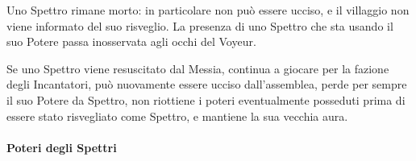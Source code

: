 \documentclass[a4paper,10pt]{article}
\begin{document}
\begin{itemize}
 Uno Spettro rimane morto: in particolare non può essere ucciso, e il villaggio non viene informato del suo risveglio.
 La presenza di uno Spettro che sta usando il suo Potere passa inosservata agli occhi del Voyeur.
 
 Se uno Spettro viene resuscitato dal Messia, continua a giocare per la fazione degli Incantatori, può nuovamente essere ucciso dall'assemblea, perde per sempre il suo Potere da Spettro, non riottiene i poteri eventualmente posseduti prima di essere stato risvegliato come Spettro, e mantiene la sua vecchia aura.
 
\end{itemize}


\paragraph{Poteri degli Spettri}
\end{document}
